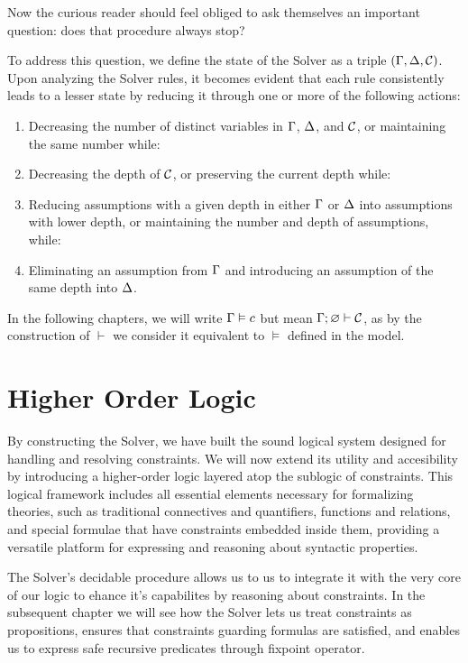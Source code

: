 \documentclass[english, mgr]{iithesis}
\newcommand{\solverRule}{\vdash}
\begin{document}
Now the curious reader should feel obliged to ask themselves an important question:
does that procedure always stop?

To address this question, we define the state of the Solver as a triple $(\Gamma, \Delta, \mathcal{C})$.
Upon analyzing the Solver rules, it becomes evident that each rule consistently
leads to a lesser state by reducing it through one or more of the following actions:
\begin{enumerate}[noitemsep]
  \item Decreasing the number of distinct variables in $\Gamma$, $\Delta$, and $\mathcal{C}$,
  or maintaining the same number while:
  \item Decreasing the depth of $\mathcal{C}$,
  or preserving the current depth while:
  \item Reducing assumptions with a given depth in either $\Gamma$ or $\Delta$ into assumptions with lower depth,
  or maintaining the number and depth of assumptions, while:
  \item Eliminating an assumption from $\Gamma$ and introducing an assumption of the same depth into $\Delta$.
\end{enumerate}

In the following chapters, we will write $\Gamma \vDash c$
but mean $\cEnv ; \varnothing\solverRule \sconstr$,
as by the construction of $\solverRule$ we consider it equivalent
to $\vDash$ defined in the model.


\chapter{Higher Order Logic}
By constructing the Solver, we have built the sound logical system designed for handling and resolving constraints.
We will now extend its utility and accesibility
by introducing a higher-order logic layered atop the sublogic of constraints.
This logical framework includes all essential elements necessary for
formalizing theories, such as traditional connectives and quantifiers,
functions and relations, and special formulae that have constraints embedded inside them,
providing a versatile platform for expressing and reasoning about syntactic properties.

The Solver's decidable procedure allows us to us to integrate
it with the very core of our logic to ehance it's capabilites
by reasoning about constraints.
In the subsequent chapter we will see how the Solver lets us
treat constraints as propositions,
ensures that constraints guarding formulas are satisfied,
and enables us to express safe recursive predicates through fixpoint operator.
\end{document}
